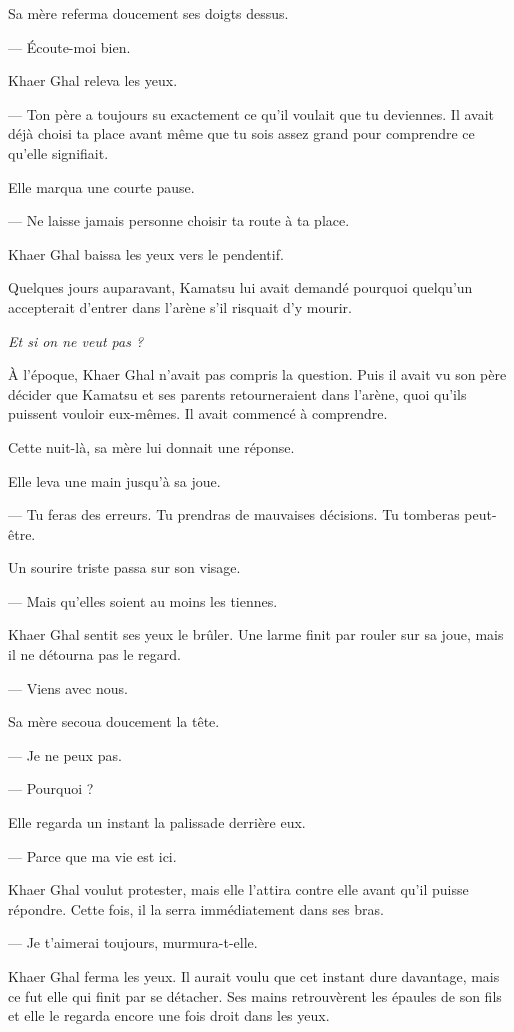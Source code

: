 Sa mère referma doucement ses doigts dessus.

— Écoute-moi bien.

Khaer Ghal releva les yeux.

— Ton père a toujours su exactement ce qu'il voulait que tu deviennes. Il avait
déjà choisi ta place avant même que tu sois assez grand pour comprendre ce
qu'elle signifiait.

Elle marqua une courte pause.

— Ne laisse jamais personne choisir ta route à ta place.

Khaer Ghal baissa les yeux vers le pendentif.

Quelques jours auparavant, Kamatsu lui avait demandé pourquoi quelqu'un
accepterait d'entrer dans l'arène s'il risquait d'y mourir.

\emph{Et si on ne veut pas ?}

À l'époque, Khaer Ghal n'avait pas compris la question. Puis il avait vu son
père décider que Kamatsu et ses parents retourneraient dans l'arène, quoi
qu'ils puissent vouloir eux-mêmes. Il avait commencé à comprendre.

Cette nuit-là, sa mère lui donnait une réponse.

Elle leva une main jusqu'à sa joue.

— Tu feras des erreurs. Tu prendras de mauvaises décisions. Tu tomberas
peut-être.

Un sourire triste passa sur son visage.

— Mais qu'elles soient au moins les tiennes.

Khaer Ghal sentit ses yeux le brûler. Une larme finit par rouler sur sa joue,
mais il ne détourna pas le regard.

— Viens avec nous.

Sa mère secoua doucement la tête.

— Je ne peux pas.

— Pourquoi ?

Elle regarda un instant la palissade derrière eux.

— Parce que ma vie est ici.

Khaer Ghal voulut protester, mais elle l'attira contre elle avant qu'il puisse
répondre. Cette fois, il la serra immédiatement dans ses bras.

— Je t'aimerai toujours, murmura-t-elle.

Khaer Ghal ferma les yeux. Il aurait voulu que cet instant dure davantage, mais
ce fut elle qui finit par se détacher. Ses mains retrouvèrent les épaules de
son fils et elle le regarda encore une fois droit dans les yeux.

